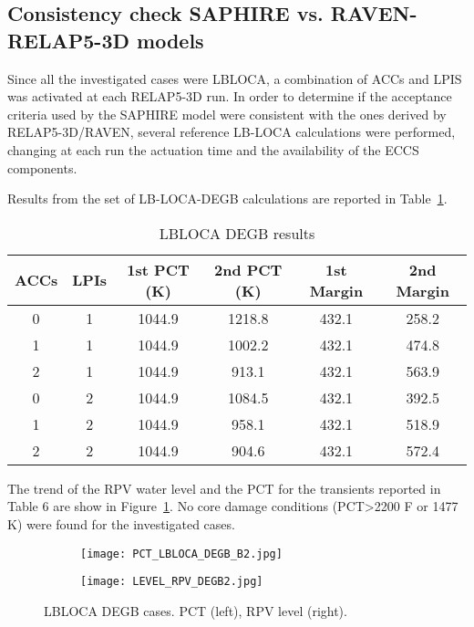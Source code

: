 \subsection{Consistency check SAPHIRE vs. RAVEN-RELAP5-3D models}

Since all the investigated cases were LBLOCA, a combination of ACCs and LPIS was activated at each RELAP5-3D run. In order to determine if the acceptance criteria used by the SAPHIRE model were consistent with the ones derived by RELAP5-3D/RAVEN, several reference LB-LOCA calculations were performed, changing at each run the actuation time and the availability of the ECCS components. 

Results from the set of LB-LOCA-DEGB calculations are reported in Table~\ref{tab:LBLOCA_DEGB}. 

\begin{table}
  \caption{LBLOCA DEGB results }
  \label{tab:LBLOCA_DEGB}
  \centering
  \begin{tabular}{c | c | c | c | c | c} 
   \hline 
     ACCs & LPIs & 1st PCT (K)  & 2nd PCT (K) & 1st Margin & 2nd Margin \\ 
    \hline 
        0 & 1 & 1044.9 & 1218.8 & 432.1 & 258.2 \\
        1 & 1 & 1044.9 & 1002.2 & 432.1 & 474.8 \\
        2 & 1 & 1044.9 & 913.1  & 432.1 & 563.9 \\
        0 & 2 & 1044.9 & 1084.5 & 432.1 & 392.5 \\
        1 & 2 & 1044.9 & 958.1  & 432.1 & 518.9 \\
        2 & 2 & 1044.9 & 904.6  & 432.1 & 572.4 \\
    \hline 
  \end{tabular}
\end{table}

The trend of the RPV water level and the PCT for the transients reported in Table 6 are show in 
Figure~\ref{fig:r5_plots}. No core damage conditions (PCT>2200 F or 1477 K) were found for the investigated cases.

\begin{figure}
  \centering
  \begin{subfigure}{.5\textwidth}
    \centering
    \centerline{\texttt{[image: PCT\_LBLOCA\_DEGB\_B2.jpg]}}
  \end{subfigure}%
  \begin{subfigure}{.5\textwidth}
    \centering
    \centerline{\texttt{[image: LEVEL\_RPV\_DEGB2.jpg]}}
  \end{subfigure}
  \caption{LBLOCA DEGB cases. PCT (left), RPV level (right).}
  \label{fig:r5_plots}
\end{figure}

